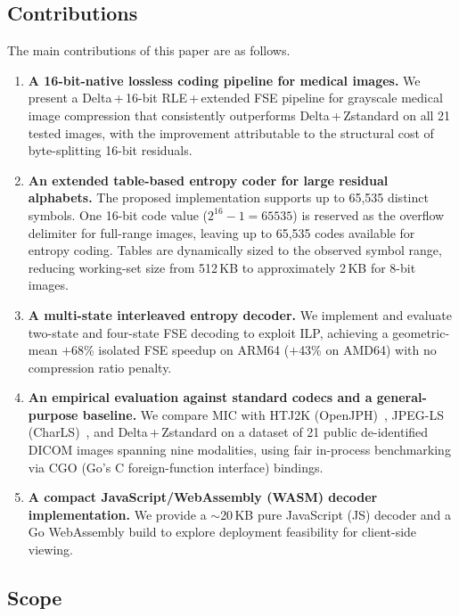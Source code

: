 \documentclass[journal]{IEEEtran}
\begin{document}
\subsection{Contributions}

The main contributions of this paper are as follows.

\begin{enumerate}
  \item \textbf{A 16-bit-native lossless coding pipeline for medical images.}
  We present a Delta\,+\,16-bit RLE\,+\,extended FSE pipeline for grayscale
  medical image compression that consistently outperforms Delta\,+\,Zstandard
  on all 21 tested images, with the improvement attributable to the structural
  cost of byte-splitting 16-bit residuals.

  \item \textbf{An extended table-based entropy coder for large residual
  alphabets.}
  The proposed implementation supports up to 65,535 distinct symbols.
  One 16-bit code value ($2^{16}-1 = 65535$) is reserved as the overflow
  delimiter for full-range images, leaving up to 65,535 codes available for
  entropy coding. Tables are dynamically sized to the observed symbol range,
  reducing working-set size from 512\,KB to approximately 2\,KB for 8-bit
  images.

  \item \textbf{A multi-state interleaved entropy decoder.}
  We implement and evaluate two-state and four-state FSE decoding to exploit
  ILP, achieving a geometric-mean $+$68\% isolated FSE speedup on ARM64
  ($+$43\% on AMD64) with no compression ratio penalty.

  \item \textbf{An empirical evaluation against standard codecs and a
  general-purpose baseline.}
  We compare MIC with HTJ2K (OpenJPH)~\cite{openjph}, JPEG-LS
  (CharLS)~\cite{charls}, and Delta\,+\,Zstandard on a dataset of 21 public
  de-identified DICOM images spanning nine modalities, using fair in-process
  benchmarking via CGO (Go's C foreign-function interface) bindings.

  \item \textbf{A compact JavaScript/WebAssembly (WASM) decoder implementation.}
  We provide a ${\sim}$20\,KB pure JavaScript (JS) decoder and a Go
  WebAssembly build to explore deployment feasibility for client-side viewing.
\end{enumerate}

\subsection{Scope}
\end{document}
